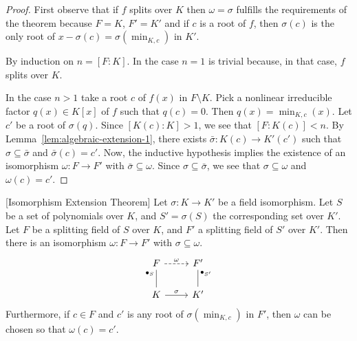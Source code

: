 \begin{proof}
    First observe that if $f$ splits over $K$ then $\omega=\sigma$ fulfills the requirements of the theorem because $F=K$, $F'=K'$ and if $c$ is a root of $f$, then $\sigma(c)$ is the only root of $x-\sigma(c)=\sigma(\min_{K,c})$ in $K'$.
    
    By induction on $n=[F:K]$. In the case $n=1$ is trivial because, in that case, $f$ splits over $K$.
    
    In the case $n>1$ take a root $c$ of $f(x)$ in $F\setminus K$. Pick a nonlinear irreducible factor $q(x)\in K[x]$ of $f$ such that $q(c)=0$. Then $q(x)=\min_{K,c}(x)$. Let $c'$ be a root of $\sigma(q)$. Since $[K(c):K]>1$, we see that $[F:K(c)]<n$. By Lemma~\ref{lem:algebraic-extension-1}, there exists $\bar\sigma\colon K(c)\to K'(c')$ such that $\sigma\subseteq\bar\sigma$ and $\bar\sigma(c)=c'$. Now, the inductive hypothesis implies the existence of an isomorphism $\omega\colon F\to F'$ with $\bar\sigma\subseteq\omega$. Since $\sigma\subseteq\bar\sigma$, we see that $\sigma\subseteq\omega$ and $\omega(c)=c'$.
    
\end{proof}

\begin{thm}\label{thm:isomorphism-extension} {\rm [Isomorphism Extension Theorem]}
    Let\/ $\sigma \colon K \to K'$ be a field isomorphism. Let\/ $S$ be a set of polynomials over\/ $K$, and\/ $S' = \sigma(S)$ the corresponding set over\/ $K'$. Let\/ $F$ be a splitting field of\/ $S$ over\/ $K$, and\/ $F'$ a splitting field of\/ $S'$ over\/ $K'$. Then there is an isomorphism\/ $\omega \colon F \to F'$ with\/ $\sigma\subseteq\omega$.
    $$
        \begin{tikzcd}
            F
                    \arrow[r,"\omega",dashed]
                &F'\\
            K
                    \arrow[r,"\sigma"]
                    \arrow[u,"\sfld_S",no head,pos=0.8]
                &K'
                    \arrow[u,"\sfld_{S'}"',no head,pos=0.8]
        \end{tikzcd}
    $$
    Furthermore, if\/ $c \in F$ and\/ $c'$ is any root of\/ $\sigma(\min_{K,c})$ in\/ $F'$, then\/ $\omega$ can be chosen so that\/ $\omega(c) = c'$.
\end{thm}

